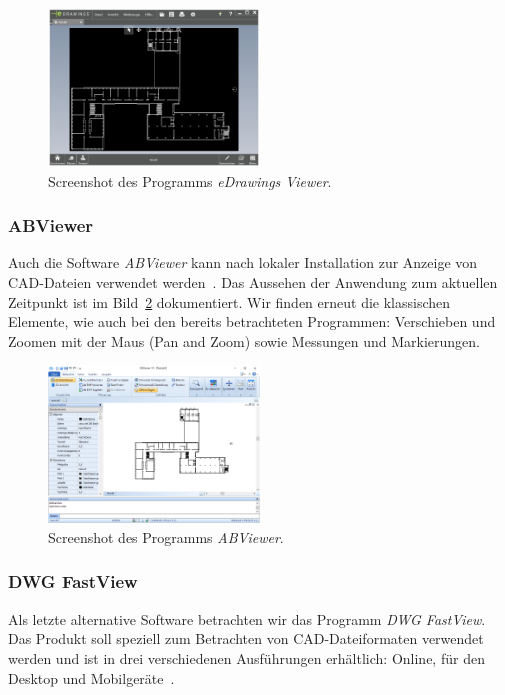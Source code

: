 \begin{figure}
    \includegraphics[width=0.5\textwidth]{res/edrawings-viewer.png}
    \caption{Screenshot des Programms \textit{eDrawings Viewer}.}
    \label{fig:edrawings-viewer}
\end{figure}

\subsubsection{ABViewer}
\label{subsubsec:abviewer}

Auch die Software \textit{ABViewer} kann nach lokaler Installation zur Anzeige von CAD-Dateien verwendet werden~\cite{ABViewer}.
Das Aussehen der Anwendung zum aktuellen Zeitpunkt ist im Bild~\ref{fig:abviewer} dokumentiert.
Wir finden erneut die klassischen Elemente, wie auch bei den bereits betrachteten Programmen: Verschieben und Zoomen mit der Maus (Pan and Zoom) sowie Messungen und Markierungen.

\begin{figure}
    \includegraphics[width=0.5\textwidth]{res/abviewer.png}
    \caption{Screenshot des Programms \textit{ABViewer}.}
    \label{fig:abviewer}
\end{figure}

\subsubsection{DWG FastView}
\label{subsubsec:dwg-fastview}

Als letzte alternative Software betrachten wir das Programm \textit{DWG FastView}.
Das Produkt soll speziell zum Betrachten von CAD-Dateiformaten verwendet werden und ist in drei verschiedenen Ausführungen erhältlich: Online, für den Desktop und Mobilgeräte~\cite{DWGFastView}.


